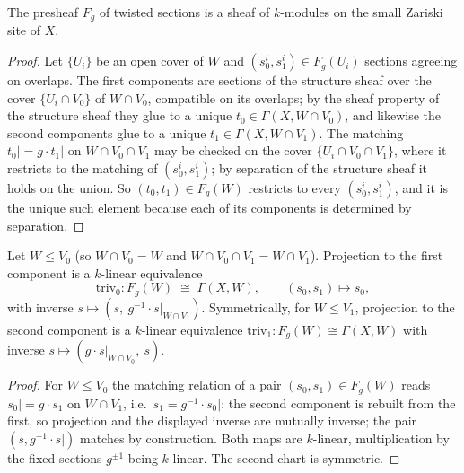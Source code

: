 \begin{theorem}
  \label{thm:twistSheaf}
  \leanok
  The presheaf \(F_g\) of twisted sections is a sheaf of \(k\)-modules on the small
  Zariski site of \(X\).
\end{theorem}
\begin{proof}
  \leanok
  Let \(\{U_i\}\) be an open cover of \(W\) and \((s_0^i, s_1^i) \in F_g(U_i)\) sections
  agreeing on overlaps. The first components are sections of the structure sheaf over the
  cover \(\{U_i \cap V_0\}\) of \(W \cap V_0\), compatible on its overlaps; by the sheaf
  property of the structure sheaf they glue to a unique \(t_0 \in \Gamma(X, W \cap V_0)\),
  and likewise the second components glue to a unique \(t_1 \in \Gamma(X, W \cap V_1)\).
  The matching \(t_0| = g \cdot t_1|\) on \(W \cap V_0 \cap V_1\) may be checked on the
  cover \(\{U_i \cap V_0 \cap V_1\}\), where it restricts to the matching of
  \((s_0^i, s_1^i)\); by separation of the structure sheaf it holds on the union. So
  \((t_0, t_1) \in F_g(W)\) restricts to every \((s_0^i, s_1^i)\), and it is the unique
  such element because each of its components is determined by separation.
\end{proof}

\begin{definition}
  \label{def:twistTriv}
  \leanok
  Let \(W \le V_0\) (so \(W \cap V_0 = W\) and \(W \cap V_0 \cap V_1 = W \cap V_1\)).
  Projection to the first component is a \(k\)-linear equivalence
  \[
    \mathrm{triv}_0 : F_g(W) \;\cong\; \Gamma(X, W), \qquad (s_0, s_1) \mapsto s_0,
  \]
  with inverse \(s \mapsto (s,\ g^{-1} \cdot s|_{W \cap V_1})\). Symmetrically, for
  \(W \le V_1\), projection to the second component is a \(k\)-linear equivalence
  \(\mathrm{triv}_1 : F_g(W) \cong \Gamma(X, W)\) with inverse
  \(s \mapsto (g \cdot s|_{W \cap V_0},\ s)\).
\end{definition}
\begin{proof}
  \leanok
  For \(W \le V_0\) the matching relation of a pair \((s_0, s_1) \in F_g(W)\) reads
  \(s_0| = g \cdot s_1\) on \(W \cap V_1\), i.e.\ \(s_1 = g^{-1} \cdot s_0|\): the second
  component is rebuilt from the first, so projection and the displayed inverse are
  mutually inverse; the pair \((s, g^{-1} \cdot s|)\) matches by construction. Both maps
  are \(k\)-linear, multiplication by the fixed sections \(g^{\pm 1}\) being
  \(k\)-linear. The second chart is symmetric.
\end{proof}

